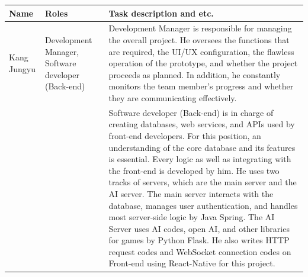 \documentclass[conference]{IEEEtran}
\begin{document}
 \begin{xtabular}{|p{1cm}|p{1.7cm}|p{5cm}|}
     \hline
     Name & Roles & Task description and etc. \\ [0.5ex] 
     \hline
     Kang Jungyu & Development Manager, Software developer (Back-end) &  
     Development Manager is responsible for managing the overall project. He oversees the functions that are required, the UI/UX configuration, the flawless operation of the prototype, and whether the project proceeds as planned. In addition, he constantly monitors the team member’s progress and whether they are communicating effectively.\\
     & &
     Software developer (Back-end) is in charge of creating databases, web services, and APIs used by front-end developers. For this position, an understanding of the core database and its features is essential. Every logic as well as integrating with the front-end is developed by him. He uses two tracks of servers, which are the main server and the AI server. The main server interacts with the database, manages user authentication, and handles most server-side logic by Java Spring. The AI Server uses AI codes, open AI, and other libraries for games by Python Flask. He also writes HTTP request codes and WebSocket connection codes on Front-end using React-Native for this project.
     

\end{xtabular}
\end{document}
